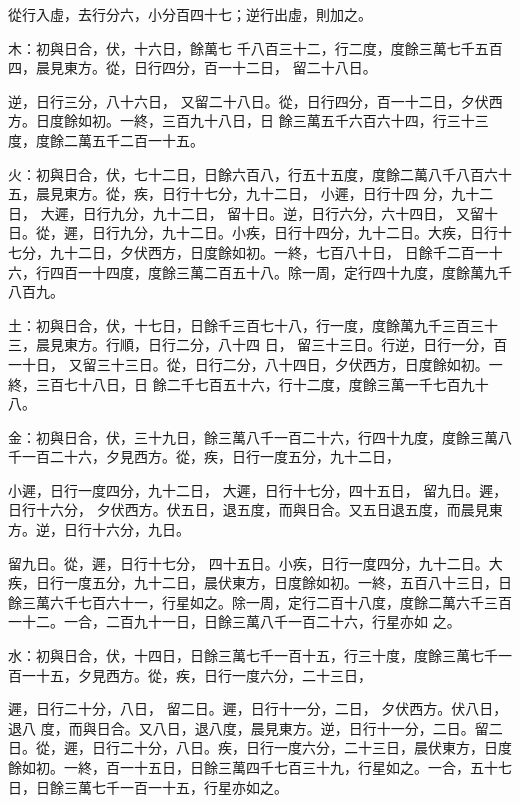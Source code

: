 \begin{pinyinscope}
 從行入虛，去行分六，小分百四十七；逆行出虛，則加之。


木：初與日合，伏，十六日，餘萬七
 千八百三十二，行二度，度餘三萬七千五百四，晨見東方。從，日行四分，百一十二日，
 留二十八日。


逆，日行三分，八十六日，
 又留二十八日。從，日行四分，百一十二日，夕伏西方。日度餘如初。一終，三百九十八日，日
 餘三萬五千六百六十四，行三十三度，度餘二萬五千二百一十五。


火：初與日合，伏，七十二日，日餘六百八，行五十五度，度餘二萬八千八百六十五，晨見東方。從，疾，日行十七分，九十二日，
 小遲，日行十四
 分，九十二日，
 大遲，日行九分，九十二日，
 留十日。逆，日行六分，六十四日，
 又留十日。從，遲，日行九分，九十二日。小疾，日行十四分，九十二日。大疾，日行十七分，九十二日，夕伏西方，日度餘如初。一終，七百八十日，
 日餘千二百一十六，行四百一十四度，度餘三萬二百五十八。除一周，定行四十九度，度餘萬九千八百九。


土：初與日合，伏，十七日，日餘千三百七十八，行一度，度餘萬九千三百三十三，晨見東方。行順，日行二分，八十四
 日，
 留三十三日。行逆，日行一分，百一十日，
 又留三十三日。從，日行二分，八十四日，夕伏西方，日度餘如初。一終，三百七十八日，日
 餘二千七百五十六，行十二度，度餘三萬一千七百九十八。


金：初與日合，伏，三十九日，餘三萬八千一百二十六，行四十九度，度餘三萬八千一百二十六，夕見西方。從，疾，日行一度五分，九十二日，


小遲，日行一度四分，九十二日，
 大遲，日行十七分，四十五日，
 留九日。遲，日行十六分，
 夕伏西方。伏五日，退五度，而與日合。又五日退五度，而晨見東方。逆，日行十六分，九日。



 留九日。從，遲，日行十七分，
 四十五日。小疾，日行一度四分，九十二日。大疾，日行一度五分，九十二日，晨伏東方，日度餘如初。一終，五百八十三日，日餘三萬六千七百六十一，行星如之。除一周，定行二百十八度，度餘二萬六千三百一十二。一合，二百九十一日，日餘三萬八千一百二十六，行星亦如
 之。


水：初與日合，伏，十四日，日餘三萬七千一百十五，行三十度，度餘三萬七千一百一十五，夕見西方。從，疾，日行一度六分，二十三日，


遲，日行二十分，八日，
 留二日。遲，日行十一分，二日，
 夕伏西方。伏八日，退八
 度，而與日合。又八日，退八度，晨見東方。逆，日行十一分，二日。留二日。從，遲，日行二十分，八日。疾，日行一度六分，二十三日，晨伏東方，日度餘如初。一終，百一十五日，日餘三萬四千七百三十九，行星如之。一合，五十七日，日餘三萬七千一百一十五，行星亦如之。




\end{pinyinscope}
